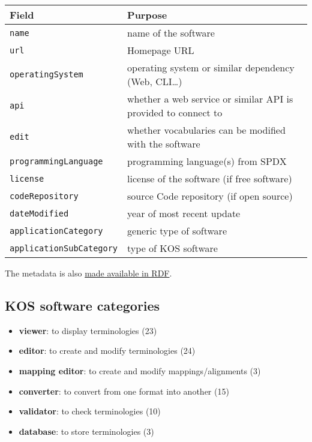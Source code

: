 \documentclass[
  DIV=10]{article}
\providecommand{\tightlist}{%
  \setlength{\itemsep}{0pt}\setlength{\parskip}{0pt}}
\begin{document}
\begin{longtable}[]{@{}
  >{\raggedright\arraybackslash}p{}
  >{\raggedright\arraybackslash}p{}@{}}
\toprule\noalign{}
\begin{minipage}[b]{\linewidth}\raggedright
Field
\end{minipage} & \begin{minipage}[b]{\linewidth}\raggedright
Purpose
\end{minipage} \\
\midrule\noalign{}
\endhead
\bottomrule\noalign{}
\endlastfoot
\texttt{name} & name of the software \\
\texttt{url} & Homepage URL \\
\texttt{operatingSystem} & operating system or similar dependency (Web,
CLI\ldots) \\
\texttt{api} & whether a web service or similar API is provided to
connect to \\
\texttt{edit} & whether vocabularies can be modified with the
software \\
\texttt{programmingLanguage} & programming language(s) from SPDX \\
\texttt{license} & license of the software (if free software) \\
\texttt{codeRepository} & source Code repository (if open source) \\
\texttt{dateModified} & year of most recent update \\
\texttt{applicationCategory} & generic type of software \\
\texttt{applicationSubCategory} & type of KOS software \\
\end{longtable}

The metadata is also \href{kos-software.ttl}{made available in RDF}.

\subsection{KOS software categories}\label{kos-software-categories}

\begin{itemize}
\tightlist
\item
  \textbf{viewer}: to display terminologies (23)
\item
  \textbf{editor}: to create and modify terminologies (24)
\item
  \textbf{mapping editor}: to create and modify mappings/alignments (3)
\item
  \textbf{converter}: to convert from one format into another (15)
\item
  \textbf{validator}: to check terminologies (10)
\item
  \textbf{database}: to store terminologies (3)
\end{itemize}
\end{document}
